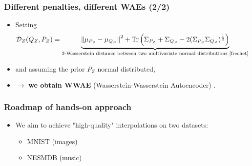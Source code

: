 \documentclass{beamer}
\DeclareMathOperator{\Tr}{Tr}
\begin{document}
\begin{frame}
\frametitle{Different penalties, different WAEs (2/2)}
\begin{itemize}
  \item Setting $$ \mathcal{D}_Z(Q_Z,P_Z) = \underbrace{\left\| \mu_{P_Z} - \mu_{Q_Z} \right\|^2 +
    \Tr \left( \Sigma_{P_Z} + \Sigma_{Q_Z} -
    2(\Sigma_{P_Z}\Sigma_{Q_Z})^{\frac{1}{2}} \right)}_{\text{2-Wasserstein distance between two multivariate normal distributions \cite{frechet}}} $$
  \item and assuming the prior $P_Z$ normal distributed,
  \item[] $\rightarrow$ \textbf{we obtain WWAE} (Wasserstein-Wasserstein Autoencoder) \cite{wwae}.
  \bigskip
\end{itemize}
\end{frame}
\begin{frame}
\frametitle{Roadmap of hands-on approach}
\begin{itemize}
  \item We aim to achieve "high-quality" interpolations on two datasets:
  \begin{itemize}
    \item MNIST (images)
    \item NESMDB \cite{nes} (music)
  \end{itemize}
\end{itemize}
\begin{enumerate}
\end{enumerate}
\end{frame}
\end{document}
